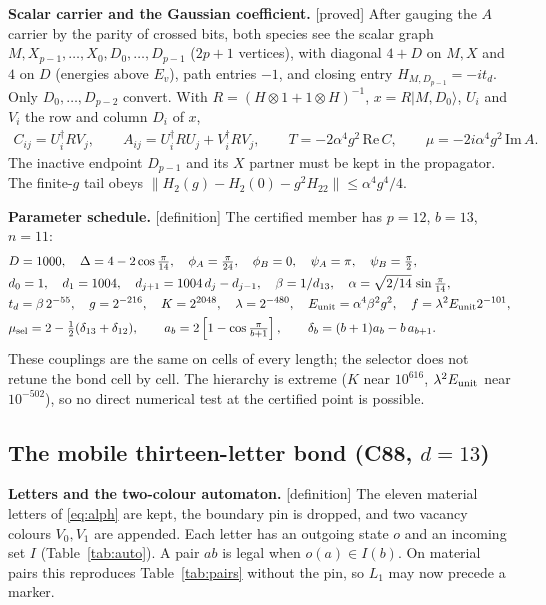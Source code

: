 \documentclass[11pt]{article}
\newcommand{\tg}[1]{\textsf{[#1]}}
\newcommand{\ket}[1]{|#1\rangle}
\begin{document}
\textbf{Scalar carrier and the Gaussian coefficient.} \tg{proved} After gauging the $A$ carrier by the parity of crossed bits, both species see the scalar graph $M,X_{p-1},\dots,X_0,D_0,\dots,D_{p-1}$ ($2p+1$ vertices), with diagonal $4+D$ on $M,X$ and $4$ on $D$ (energies above $E_v$), path entries $-1$, and closing entry $H_{M,D_{p-1}}=-it_d$. Only $D_0,\dots,D_{p-2}$ convert. With $R=(H\otimes1+1\otimes H)^{-1}$, $x=R\ket{M,D_0}$, $U_i$ and $V_i$ the row and column $D_i$ of $x$,
\begin{align}
C_{ij}=U_i^\dagger RV_j,\qquad A_{ij}=U_i^\dagger RU_j+V_i^\dagger RV_j,\qquad T=-2\alpha^4g^2\,\mathrm{Re}\,C,\qquad \mu=-2i\alpha^4g^2\,\mathrm{Im}\,A .\label{eq:TA}
\end{align}
The inactive endpoint $D_{p-1}$ and its $X$ partner must be kept in the propagator. The finite-$g$ tail obeys $\|H_2(g)-H_2(0)-g^2H_{22}\|\le\alpha^4g^4/4$.

\textbf{Parameter schedule.} \tg{definition} The certified member has $p=12$, $b=13$, $n=11$:
\begin{align}
&D=1000,\quad \Delta=4-2\cos\tfrac{\pi}{14},\quad \phi_A=\tfrac{\pi}{24},\quad \phi_B=0,\quad \psi_A=\pi,\quad \psi_B=\tfrac{\pi}{2},\nonumber\\
&d_0=1,\quad d_1=1004,\quad d_{j+1}=1004\,d_j-d_{j-1},\quad \beta=1/d_{13},\quad \alpha=\sqrt{2/14}\,\sin\tfrac{\pi}{14},\nonumber\\
&t_d=\beta\,2^{-55},\quad g=2^{-216},\quad K=2^{2048},\quad \lambda=2^{-480},\quad E_{\rm unit}=\alpha^4\beta^2g^2,\quad f=\lambda^2E_{\rm unit}2^{-101},\nonumber\\
&\mu_{\rm sel}=2-\tfrac12(\delta_{13}+\delta_{12}),\qquad a_b=2\left[1-\cos\tfrac{\pi}{b+1}\right],\qquad \delta_b=(b+1)a_b-b\,a_{b+1}.\label{eq:sched11}
\end{align}
These couplings are the same on cells of every length; the selector does not retune the bond cell by cell. The hierarchy is extreme ($K$ near $10^{616}$, $\lambda^2E_{\rm unit}$ near $10^{-502}$), so no direct numerical test at the certified point is possible.

\subsection{The mobile thirteen-letter bond (C88, $d=13$)}

\textbf{Letters and the two-colour automaton.} \tg{definition} The eleven material letters of \eqref{eq:alph} are kept, the boundary pin is dropped, and two vacancy colours $V_0,V_1$ are appended. Each letter has an outgoing state $o$ and an incoming set $I$ (Table~\ref{tab:auto}). A pair $ab$ is legal when $o(a)\in I(b)$. On material pairs this reproduces Table~\ref{tab:pairs} without the pin, so $L_1$ may now precede a marker.
\end{document}
